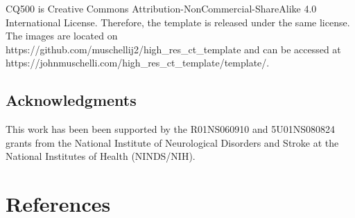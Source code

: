 \documentclass[]{elsarticle} %
\begin{document}
CQ500 is Creative Commons Attribution-NonCommercial-ShareAlike 4.0 International License. Therefore, the template is released under the same license. The images are located on https://github.com/muschellij2/high\_res\_ct\_template and can be accessed at https://johnmuschelli.com/high\_res\_ct\_template/template/.

\hypertarget{acknowledgments}{%
\subsection{Acknowledgments}\label{acknowledgments}}

This work has been been supported by the R01NS060910 and 5U01NS080824 grants from the National Institute of Neurological Disorders and Stroke at the National Institutes of Health (NINDS/NIH).

\hypertarget{references}{%
\section*{References}\label{references}}
\end{document}

